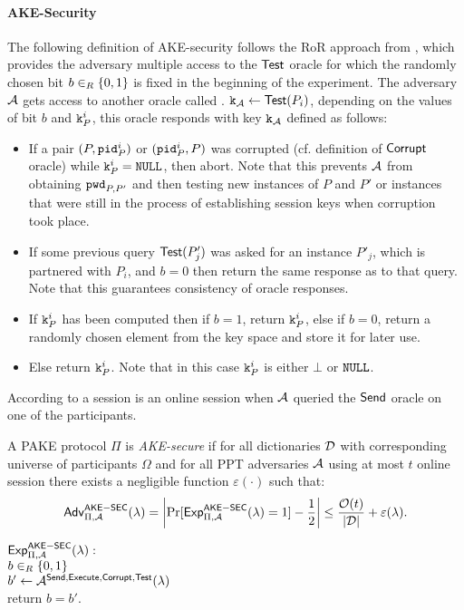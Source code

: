 \paragraph{AKE-Security}\label{ssec:pake}
The following definition of \ac{AKE}-security follows the \ac{RoR} approach from \cite{Abdalla2005}, which provides the adversary multiple access to the $\mathsf{Test}$ oracle for which the randomly chosen bit $b\in_R\{0,1\}$ is fixed in the beginning of the experiment.
The adversary $\mathcal{A}$ gets access to another oracle called \Test.
$\mathtt{k}_\mathcal{A}\gets\mathsf{Test}(P_i)$, depending on the values of bit $b$ and $\mathtt{k}^i_P$, this oracle responds with key $\mathtt{k}_\mathcal{A}$ defined as follows:
\begin{itemize}
	\item If a pair $(P,\mathtt{pid}^i_P)$ or $(\mathtt{pid}^i_P, P)$ was corrupted (cf. definition of $\mathsf{Corrupt}$ oracle) while $\mathtt{k}^i_P=\mathtt{NULL}$, then abort. Note that this prevents $\mathcal{A}$ from obtaining $\mathtt{pwd}_{P,P'}$ and then testing new instances of $P$ and $P'$ or instances that were still in the process of establishing session keys when corruption took place.
	\item If some previous query $\mathsf{Test}(P'_j)$ was asked for an instance $P'_j$, which is partnered with $P_i$, and $b=0$ then return the same response as to that query. Note that this guarantees consistency of oracle responses.
	\item If $\mathtt{k}^i_P$ has been computed then if $b=1$, return $\mathtt{k}^i_P$, else if $b=0$, return a randomly chosen element from the key space and store it for later use.
	\item Else return $\mathtt{k}^i_P$. Note that in this case $\mathtt{k}^i_P$ is either $\bot$ or $\mathtt{NULL}$.
\end{itemize}
According to \cite{Abdalla2005} a session is an online session when $\mathcal{A}$ queried the $\mathsf{Send}$ oracle on one of the participants.

\begin{definition}\label{def:ake}
A \ac{PAKE} protocol $\Pi$ is \emph{\ac{AKE}-secure} if for all dictionaries $\mathcal{D}$ with corresponding universe of participants $\Omega$ and for all \ac{PPT} adversaries $\mathcal{A}$ using at most $t$ online session there exists a negligible function $\varepsilon(\cdot)$ such that:
\[\mathsf{Adv}^{\mathsf{AKE-SEC}}_{\Pi,\mathcal{A}}(\lambda)=\left|\Pr[\mathsf{Exp}_{\Pi,\mathcal{A}}^{\mathsf{AKE-SEC}}(\lambda)=1]-\frac12\right|\leq \frac{\mathcal{O}(t)}{|\mathcal{D}|}+\varepsilon(\lambda).\]

\noindent$\mathsf{Exp}_{\Pi,\mathcal{A}}^{\mathsf{AKE-SEC}}(\lambda):$ \\
\hspace*{2em} $b\in_R\{0,1\}$\\
\hspace*{2em} $b'\gets\mathcal{A}^{\mathsf{Send},\mathsf{Execute},\mathsf{Corrupt},\mathsf{Test}}(\lambda)$\\
\hspace*{2em} return $b=b'$.
\eod
\end{definition}

